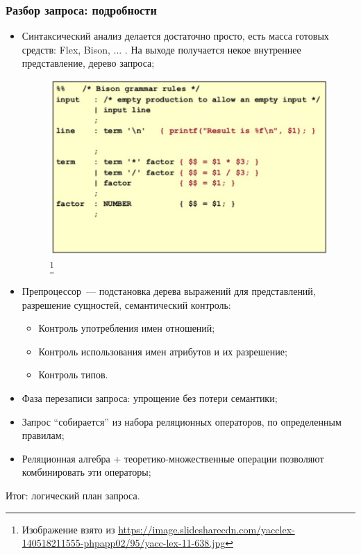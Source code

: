 \documentclass{beamer}
\begin{document}
\begin{frame}[allowframebreaks]
\frametitle{Разбор запроса: подробности}

\begin{itemize}
  \setlength\itemsep{1em}
  \item Синтаксический анализ делается достаточно просто, есть масса готовых средств: Flex, Bison, ... . На выходе получается некое внутреннее представление, дерево запроса;
\begin{figure}[htb]
\includegraphics[width=\textwidth,height=0.6\textheight,keepaspectratio]{grammar.png} 
\footnote{\tiny{Изображение взято из \url{https://image.slidesharecdn.com/yacclex-140518211555-phpapp02/95/yacc-lex-11-638.jpg}}}
\end{figure}

  \item Препроцессор~--- подстановка дерева выражений для представлений, разрешение сущностей, семантический контроль:
  \begin{itemize}
    \item Контроль употребления имен отношений;
    \item Контроль использования имен атрибутов и их разрешение;
    \item Контроль типов.
  \end{itemize}  
  \item Фаза перезаписи запроса: упрощение без потери семантики;
  \item Запрос ``собирается'' из набора реляционных операторов, по определенным правилам;
  \item Реляционная алгебра + теоретико-множественные операции позволяют комбинировать эти операторы;
\end{itemize}
Итог: логический план запроса.
\end{frame}
\end{document}
